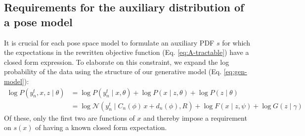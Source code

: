\documentclass{article}         %
\newcommand{\NN}{\mathcal{N}}
\begin{document}
\subsection{Requirements for the auxiliary distribution of a pose model}
\label{sec:s}

It is crucial for each pose space model to formulate an auxiliary PDF $s$ for which the expectations in the rewritten objective function (Eq. \ref{eq:A-tractable}) have a closed form expression. To elaborate on this constraint, we expand the log probability of the data using the structure of our generative model (Eq. \ref{eq:gen-model}): 
\begin{align}
    \log P(y^t_n, x, z \mid \theta) &= \log P(y^t_n \mid x, \theta) + \log P(x\mid z, \theta) + \log P(z\mid \theta) \\
    &= \log \NN(y^t_n \mid C_n(\phi)\, x + d_n(\phi), R) + \log F(x\mid z,\psi) + \log G(z \mid \gamma)
    \label{eq:logprob-terms}
\end{align}
Of these, only the first two are functions of $x$ and thereby impose a requirement on $s(x)$ of having a known closed form expectation.
\end{document}
